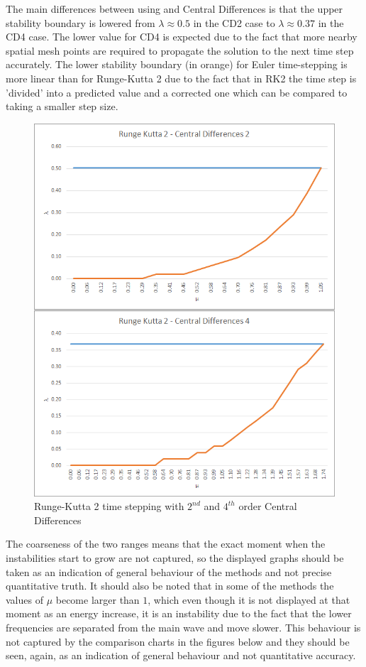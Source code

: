 The main differences between using  and  Central Differences is that the upper stability boundary is lowered from $\lambda \approx 0.5$ in the CD2 case to $\lambda \approx 0.37$ in the CD4 case. The lower value for CD4 is expected due to the fact that more nearby spatial mesh points are required to propagate the solution to the next time step accurately. The lower stability boundary (in orange) for Euler time-stepping is more linear than for Runge-Kutta 2 due to the fact that in RK2 the time step is 'divided' into a predicted value and a corrected one which can be compared to taking a smaller step size.

\begin{figure}[ht!]
\centering
\includegraphics[scale=0.8]{./TEXT/RK2.png}
\caption{Runge-Kutta 2 time stepping with $2^{nd}$ and $4^{th}$ order Central Differences}
\label{rk2}
\end{figure}

The coarseness of the two ranges means that the exact moment when the instabilities start to grow are not captured, so the displayed graphs should be taken as an indication of general behaviour of the methods and not precise quantitative truth. It should also be noted that in some of the methods the values of $\mu$ become larger than $1$, which even though it is not displayed at that moment as an energy increase, it is an instability due to the fact that the lower frequencies are separated from the main wave and move slower. This behaviour is not captured by the comparison charts in the figures below and they should be seen, again, as an indication of general behaviour and not quantitative accuracy.
